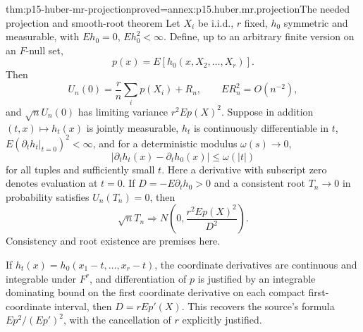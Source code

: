 \begin{hbtheorem}{thm:p15-huber-mr-projection}{proved=annex:p15.huber.mr.projection}{The needed projection and smooth-root theorem}
Let \(X_i\) be i.i.d., \(r\) fixed, \(h_0\) symmetric and measurable,
with \(Eh_0=0\), \(Eh_0^2<\infty\). Define, up to an arbitrary
finite version on an \(F\)-null set,
\[
 p(x)=E[h_0(x,X_2,\ldots,X_r)].
\]
Then
\[
 U_n(0)=\frac r n\sum_i p(X_i)+R_n,\qquad ER_n^2=O(n^{-2}),
\]
and \(\sqrt nU_n(0)\) has limiting variance \(r^2Ep(X)^2\).
Suppose in addition \((t,x)\mapsto h_t(x)\) is jointly measurable,
\(h_t\) is continuously differentiable in \(t\),
\(E(\partial_t h_t|_{t=0})^2<\infty\), and for a deterministic
modulus \(\omega(s)\to0\),
\[
 |\partial_t h_t(x)-\partial_t h_0(x)|\leq\omega(|t|)
\]
for all tuples and sufficiently small \(t\).
Here a derivative with subscript zero denotes evaluation at \(t=0\).
If \(D=-E\partial_t h_0>0\) and a consistent root \(T_n\to0\)
in probability satisfies \(U_n(T_n)=0\), then
\[
 \sqrt nT_n\Longrightarrow
 N\left(0,\frac{r^2Ep(X)^2}{D^2}\right).
\]
Consistency and root existence are premises here.

If \(h_t(x)=h_0(x_1-t,\ldots,x_r-t)\), the coordinate derivatives
are continuous and integrable under \(F^r\), and differentiation
of \(p\) is justified by an integrable dominating bound on the
first coordinate derivative on each compact first-coordinate
interval, then \(D=rEp'(X)\). This recovers the source's formula
\(Ep^2/(Ep')^2\), with the cancellation of \(r\) explicitly justified.
\end{hbtheorem}

